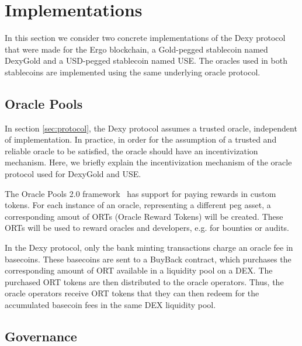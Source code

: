 \documentclass{ifcolog}
\newcommand{\dx}{Dexy}
\newcommand{\dxg}{DexyGold}
\newcommand{\dxusd}{USE}
\begin{document}
\section{Implementations}
\label{sec:implementations}

In this section we consider two concrete implementations of the \dx{} protocol that were made for the Ergo blockchain, 
a Gold-pegged stablecoin named \dxg{} and a USD-pegged stablecoin named \dxusd{}. The oracles used in both stablecoins are
implemented using the same underlying oracle protocol.

\subsection{Oracle Pools}
\label{subscec:oracle}

In section \ref{sec:protocol}, the Dexy protocol assumes a trusted oracle, independent of implementation. 
In practice, in order for the assumption of a trusted and reliable oracle to be satisfied, the oracle should 
have an incentivization mechanism. Here, we briefly explain the incentivization mechanism of the oracle 
protocol used for \dxg{} and \dxusd{}.

The Oracle Pools 2.0 framework~\cite{eip23} has support for paying rewards in custom tokens. For each instance of an oracle, 
representing a different peg asset, a corresponding amout of ORTs (Oracle Reward Tokens) will be created. 
These ORTs will be used to reward oracles and developers, e.g. for bounties or audits.

In the Dexy protocol, only the bank minting transactions charge an oracle fee in basecoins. 
These basecoins are sent to a BuyBack contract, which purchases the corresponding amount of ORT available in a liquidity pool on a DEX. 
The purchased ORT tokens are then distributed to the oracle operators. Thus, the oracle operators receive ORT tokens that they 
can then redeem for the accumulated basecoin fees in the same DEX liquidity pool.


\subsection{Governance}
\label{subsec:governance}
\end{document}

